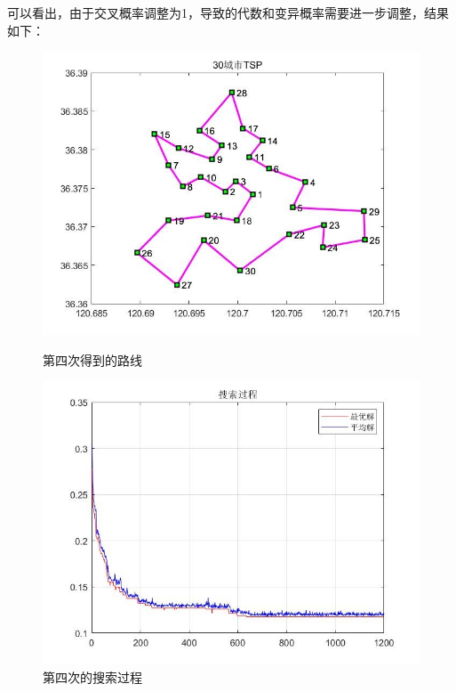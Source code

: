 \documentclass{article}
\begin{document}
可以看出，由于交叉概率调整为1，导致的代数和变异概率需要进一步调整，结果如下：
\vspace{0.5ex}
\begin{figure}[H]
	\begin{minipage}[t]{0.5\textwidth}
		\centering
		\includegraphics[scale=0.47]{7.7.jpg}
		\caption{第四次得到的路线}
	\end{minipage}
	\qquad
	\begin{minipage}[t]{0.5\textwidth}
		\centering
		\includegraphics[scale=0.47]{7.8.jpg}
		\caption{第四次的搜索过程}
	\end{minipage}
\end{figure}
\vspace{0.5ex}
\end{document}
